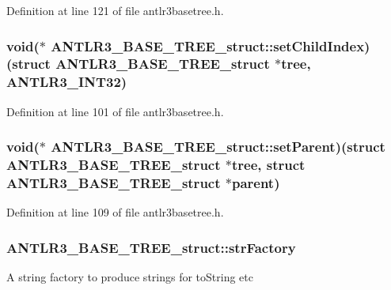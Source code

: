 Definition at line 121 of file antlr3basetree.\-h.

\hypertarget{struct_a_n_t_l_r3___b_a_s_e___t_r_e_e__struct_a41f42cb600ed1f9f4bf82d64600b6e15}{
\subsubsection[{set\-Child\-Index}]{\setlength{\rightskip}{0pt plus 5cm}void($\ast$ A\-N\-T\-L\-R3\-\_\-\-B\-A\-S\-E\-\_\-\-T\-R\-E\-E\-\_\-struct\-::set\-Child\-Index)(struct {\bf A\-N\-T\-L\-R3\-\_\-\-B\-A\-S\-E\-\_\-\-T\-R\-E\-E\-\_\-struct} $\ast$tree, {\bf A\-N\-T\-L\-R3\-\_\-\-I\-N\-T32})}}\label{struct_a_n_t_l_r3___b_a_s_e___t_r_e_e__struct_a41f42cb600ed1f9f4bf82d64600b6e15}


Definition at line 101 of file antlr3basetree.\-h.

\hypertarget{struct_a_n_t_l_r3___b_a_s_e___t_r_e_e__struct_ad01bb7cd22fb767ea03a94f1d7019784}{
\subsubsection[{set\-Parent}]{\setlength{\rightskip}{0pt plus 5cm}void($\ast$ A\-N\-T\-L\-R3\-\_\-\-B\-A\-S\-E\-\_\-\-T\-R\-E\-E\-\_\-struct\-::set\-Parent)(struct {\bf A\-N\-T\-L\-R3\-\_\-\-B\-A\-S\-E\-\_\-\-T\-R\-E\-E\-\_\-struct} $\ast$tree, struct {\bf A\-N\-T\-L\-R3\-\_\-\-B\-A\-S\-E\-\_\-\-T\-R\-E\-E\-\_\-struct} $\ast$parent)}}\label{struct_a_n_t_l_r3___b_a_s_e___t_r_e_e__struct_ad01bb7cd22fb767ea03a94f1d7019784}


Definition at line 109 of file antlr3basetree.\-h.

\hypertarget{struct_a_n_t_l_r3___b_a_s_e___t_r_e_e__struct_aacf6a3d7f5230c88eee3bc601deacf27}{
\subsubsection[{str\-Factory}]{ A\-N\-T\-L\-R3\-\_\-\-B\-A\-S\-E\-\_\-\-T\-R\-E\-E\-\_\-struct\-::str\-Factory}}\label{struct_a_n_t_l_r3___b_a_s_e___t_r_e_e__struct_aacf6a3d7f5230c88eee3bc601deacf27}
A string factory to produce strings for to\-String etc 

